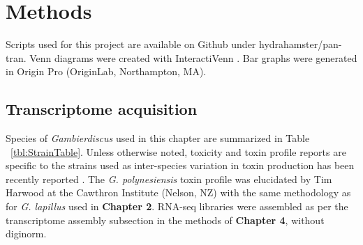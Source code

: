 \documentclass[12pt]{article}
\begin{document}
\section{Methods}
Scripts used for this project are available on Github under hydrahamster/pan-tran. 
Venn diagrams were created with InteractiVenn \cite{heberle2015venn}. 
Bar graphs were generated in Origin Pro (OriginLab, Northampton, MA).

\subsection{Transcriptome acquisition}
Species of \textit{Gambierdiscus} used in this chapter are summarized in Table ~\ref{tbl:StrainTable}. 
Unless otherwise noted, toxicity and toxin profile reports are specific to the strains used as inter-species variation in toxin production has been recently reported \cite{larsson2018toxicology,rhodes2017epiphytic}. 
The \textit{G. polynesiensis} toxin profile was elucidated by Tim Harwood at the Cawthron Institute (Nelson, NZ) with the same methodology as for \textit{G. lapillus} used in \textbf{Chapter 2}. 
RNA-seq libraries were assembled as per the transcriptome assembly subsection in the methods of \textbf{Chapter 4}, without diginorm. \\



\end{document}
